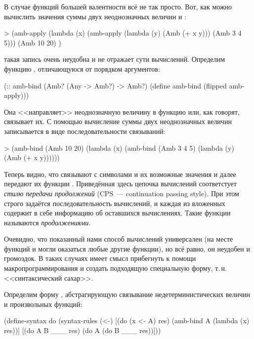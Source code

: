 В случае функций большей валентности всё не так просто. Вот, как можно вычислить значения суммы двух неоднозначных величин  и :
\begin{SchemeCode}[emph={x,y}]
   > (amb-apply 
      (lambda (x) 
        (amb-apply 
         (lambda (y) 
           (Amb (+ x y))) 
         (Amb 3 4 5)))
      (Amb 10 20) )
\end{SchemeCode}\vspace{-\medskipamount}
 такая запись очень неудобна и не отражает сути вычислений. Определим функцию , отличающуюся от  порядком аргументов:
\newpage
\begin{Definition}
(:: amb-bind (Amb? (Any -> Amb?) -> Amb?)
  (define amb-bind (flipped amb-apply)))
\end{Definition}
Она <<направляет>> неоднозначную величину в функцию или, как говорят, связывает их. С помощью  вычисление суммы двух неоднозначных величин записывается в виде последовательности связываний:
\begin{SchemeCode}[emph={x,y}]
  > (amb-bind 
     (Amb 10 20) (lambda (x) 
                   (amb-bind 
                     (Amb 3 4 5) (lambda (y) 
                                   (Amb (+ x y))))))
\end{SchemeCode}\vspace{-\medskipamount}
Теперь видно, что  связывают с символами  и  их возможные значения и далее передают их функции \s{+}. Приведённая здесь цепочка вычислений соответстует \emph{стилю передачи продолжений} (CPS~--- continuation passing style). При этом строго задаётся последовательность вычислений, и каждая из вложенных  содержит в себе информацию об оставшихся вычислениях. Такие функции называются \emph{продолжениями}.

Очевидно, что показанный нами способ вычислений универсален (на месте функций   и \s{+} могли оказаться любые другие функции), но всё равно, он неудобен и громоздок. В таких случаях имеет смысл прибегнуть к помощи макропрограммирования и создать подходящую специальную форму, т.\,н. <<синтаксический сахар>>.

Определим форму , абстрагирующую связывание недетерминистических величин и произвольных функций:

\begin{Definition}[emph={x,A,res,B}]
(define-syntax do
  (syntax-rules (<-) 
    [(do (x <- A) res) (amb-bind A (lambda (x) res))]
    [(do A B ___ res)  (do A (do B ___ res))]))
\end{Definition}

